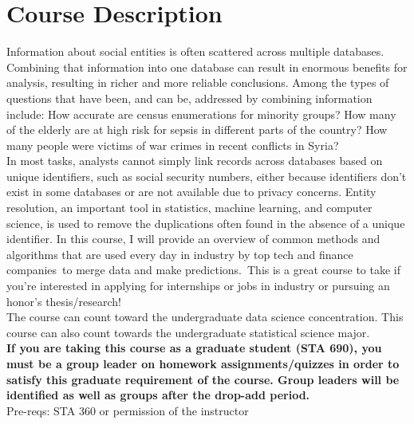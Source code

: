 \documentclass[11pt]{article}
\begin{document}
\section{Course Description}
Information about social entities is often scattered across multiple databases. Combining that information into one database can result in enormous benefits for analysis, resulting in richer and more reliable conclusions. Among the types of questions that have been, and can be, addressed by combining information include: How accurate are census enumerations for minority groups? How many of the elderly are at high risk for sepsis in different parts of the country? How many people were victims of war crimes in recent conflicts in Syria? \\

In most tasks, analysts cannot simply link records across databases based on unique identifiers, such as social security numbers, either because identifiers don't exist in some databases or are not available due to privacy concerns. Entity resolution, an important tool in statistics, machine learning, and computer science, is used to remove the duplications often found in the absence of a unique identifier. In this course, I will provide an overview of common methods and algorithms that are used every day in industry by top tech and finance companies to merge data and make predictions. This is a great course to take if you’re interested in applying for internships or jobs in industry or pursuing an honor’s thesis/research! \\


The course can count toward the undergraduate data science concentration. This course can also count towards the undergraduate statistical science major. \\

\textbf{If you are taking this course as a graduate student (STA 690), you must be a group leader on homework assignments/quizzes in order to satisfy this graduate requirement of the course. Group leaders will be identified as well as groups after the drop-add period.}\\

Pre-reqs: STA 360 or permission of the instructor
\end{document}
